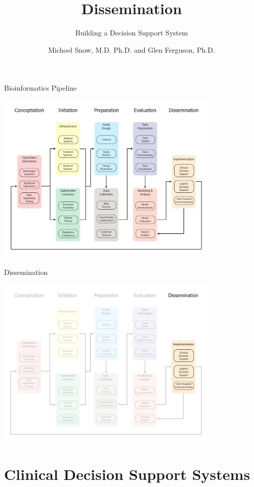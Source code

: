 \documentclass[10pt]{beamer}
\title{Dissemination}
\subtitle{Building a Decision Support System}
\date{}
\author{Michoel Snow, M.D. Ph.D. and Glen Ferguson, Ph.D.}
\institute{Center for Health Data Innovations}
\begin{document}
\maketitle

\begin{frame}{Bioinformatics Pipeline}
	\begin{center}
		\includegraphics[width=0.8\textwidth]{images/informatics_pipeline.pdf}	
	\end{center}
\end{frame}


\begin{frame}{Dissemination}
	\begin{center}
		\includegraphics[width=0.8\textwidth]{images/informatics_pipeline_implementation.pdf}
	\end{center}
\end{frame}

\section{Clinical Decision Support Systems}
\end{document}
